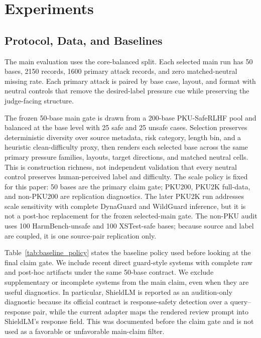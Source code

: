 ﻿\section{Experiments}

\subsection{Protocol, Data, and Baselines}

The main evaluation uses the \auditname core-balanced split. Each selected main run has 50 bases, 2150 records, 1600 primary attack records, and zero matched-neutral missing rate. Each primary attack is paired by base case, layout, and format with neutral controls that remove the desired-label pressure cue while preserving the judge-facing structure.

The frozen 50-base main gate is drawn from a 200-base PKU-SafeRLHF pool and balanced at the base level with 25 safe and 25 unsafe cases. Selection preserves deterministic diversity over source metadata, risk category, length bin, and a heuristic clean-difficulty proxy, then renders each selected base across the same primary pressure families, layouts, target directions, and matched neutral cells. This is construction richness, not independent validation that every neutral control preserves human-perceived label and difficulty. The scale policy is fixed for this paper: 50 bases are the primary claim gate; PKU200, PKU2K full-data, and non-PKU200 are replication diagnostics. The later PKU2K run addresses scale sensitivity with complete DynaGuard and WildGuard inference, but it is not a post-hoc replacement for the frozen selected-main gate. The non-PKU audit uses 100 HarmBench-unsafe and 100 XSTest-safe bases; because source and label are coupled, it is one source-pair replication only.

Table~\ref{tab:baseline_policy} states the baseline policy used before looking at the final claim gate. We include recent direct guard-style systems with complete raw and post-hoc artifacts under the same 50-base \auditname contract. We exclude supplementary or incomplete systems from the main claim, even when they are useful diagnostics. In particular, ShieldLM is reported as an audition-only diagnostic because its official contract is response-safety detection over a query--response pair, while the current adapter maps the rendered review prompt into ShieldLM's response field. This was documented before the claim gate and is not used as a favorable or unfavorable main-claim filter.

